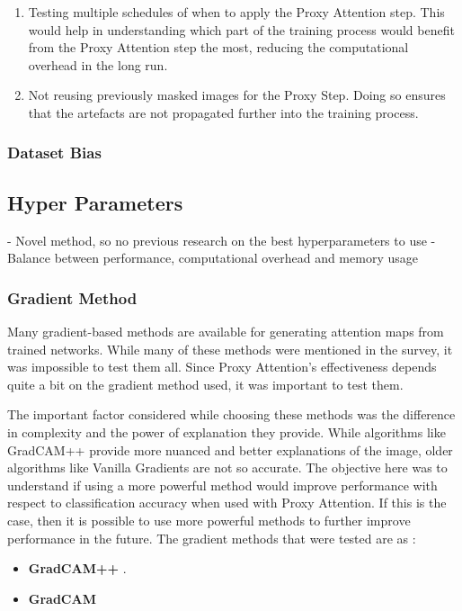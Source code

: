 \begin{enumerate}
    \item Testing multiple schedules of when to apply the Proxy Attention step. This would help in understanding which part of the training process would benefit from the Proxy Attention step the most, reducing the computational overhead in the long run.
    \item Not reusing previously masked images for the Proxy Step. Doing so ensures that the artefacts are not propagated further into the training process.
\end{enumerate}

\subsubsection{Dataset Bias}

\subsection{Hyper Parameters} \label{sec:hyperparameters}
- Novel method, so no previous research on the best hyperparameters to use
- Balance between performance, computational overhead and memory usage

\subsubsection{Gradient Method}
Many gradient-based methods are available for generating attention maps from trained networks. While many of these methods were mentioned in the survey, it was impossible to test them all. Since Proxy Attention's effectiveness depends quite a bit on the gradient method used, it was important to test them.

The important factor considered while choosing these methods was the difference in complexity and the power of explanation they provide. While algorithms like GradCAM++ \cite{chattopadhayGradCAMGeneralizedGradientBased2018} provide more nuanced and better explanations of the image, older algorithms like Vanilla Gradients \cite{zeilerVisualizingUnderstandingConvolutional2013} are not so accurate. The objective here was to understand if using a more powerful method would improve performance with respect to classification accuracy when used with Proxy Attention. If this is the case, then it is possible to use more powerful methods to further improve performance in the future.
The gradient methods that were tested are as :
\begin{itemize}
    \item \textbf{GradCAM++} \cite{chattopadhayGradCAMGeneralizedGradientBased2018}.
    \item \textbf{GradCAM} \cite{selvarajuGradCAMVisualExplanations}
\end{itemize}

